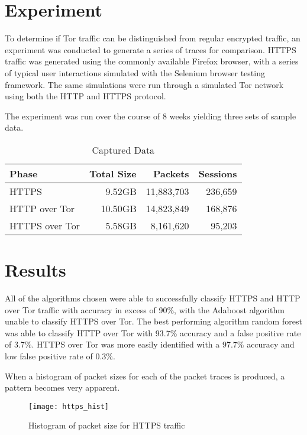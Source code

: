 \documentclass[conference]{IEEEtran}
\begin{document}
\section{Experiment}

To determine if Tor traffic can be distinguished from regular encrypted
traffic, an experiment was conducted to generate a series of traces for
comparison. HTTPS traffic was generated using the commonly available Firefox
browser, with a series of typical user interactions simulated with the Selenium
browser testing framework. The same simulations were run through a simulated
Tor network using both the HTTP and HTTPS protocol.

The experiment was run over the course of 8 weeks yielding three sets of sample
data.

\begin{table}[H]
  \begin{tabular*}{\linewidth}{lrrr}
    \toprule
    Phase & Total Size & Packets & Sessions\\
    \midrule
    HTTPS & 9.52GB & 11,883,703 & 236,659\\
    HTTP over Tor & 10.50GB & 14,823,849 & 168,876\\
    HTTPS over Tor & 5.58GB & 8,161,620 & 95,203\\
    \bottomrule
  \end{tabular*}
  \caption{Captured Data} \label{table:datasets}
\end{table}


\section{Results}

All of the algorithms chosen were able to successfully classify HTTPS and HTTP
over Tor traffic with accuracy in excess of 90\%, with the Adaboost algorithm
unable to classify HTTPS over Tor. The best performing algorithm random forest
was able to classify HTTP over Tor with 93.7\% accuracy and a false positive
rate of 3.7\%. HTTPS over Tor was more easily identified with a 97.7\% accuracy
and low false positive rate of 0.3\%.



When a histogram of packet sizes for each of the packet traces is produced, a
pattern becomes very apparent.

\begin{figure}[H]
  \centering\texttt{[image: https\_hist]}
  \caption{Histogram of packet size for HTTPS traffic}
  \label{https_hist}
\end{figure}
\end{document}
